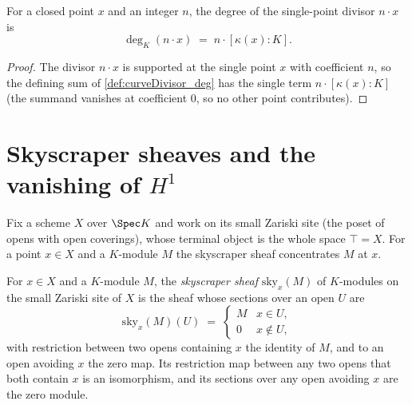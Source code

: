 \begin{lemma}
  \label{lem:curveDivisor_deg_single}
  \leanok
  For a closed point \(x\) and an integer \(n\), the degree of the single-point divisor
  \(n \cdot x\) is
  \[
    \deg_K(n \cdot x) \;=\; n \cdot [\kappa(x) : K] .
  \]
\end{lemma}
\begin{proof}
  \leanok
  The divisor \(n \cdot x\) is supported at the single point \(x\) with coefficient \(n\), so the
  defining sum of \ref{def:curveDivisor_deg} has the single term \(n \cdot [\kappa(x) : K]\)
  (the summand vanishes at coefficient \(0\), so no other point contributes).
\end{proof}

\section{Skyscraper sheaves and the vanishing of \(H^1\)}

Fix a scheme \(X\) over \(\Spec K\) and work on its small Zariski site (the poset of opens with
open coverings), whose terminal object is the whole space \(\top = X\). For a point \(x \in X\)
and a \(K\)-module \(M\) the skyscraper sheaf concentrates \(M\) at \(x\).

\begin{definition}
  \label{def:skyModule}
  \leanok
  For \(x \in X\) and a \(K\)-module \(M\), the \emph{skyscraper sheaf} \(\mathrm{sky}_x(M)\) of
  \(K\)-modules on the small Zariski site of \(X\) is the sheaf whose sections over an open
  \(U\) are
  \[
    \mathrm{sky}_x(M)(U) \;=\;
      \begin{cases} M & x \in U, \\ 0 & x \notin U, \end{cases}
  \]
  with restriction between two opens containing \(x\) the identity of \(M\), and to an open
  avoiding \(x\) the zero map. Its restriction map between any two opens that both contain \(x\)
  is an isomorphism, and its sections over any open avoiding \(x\) are the zero module.
\end{definition}

